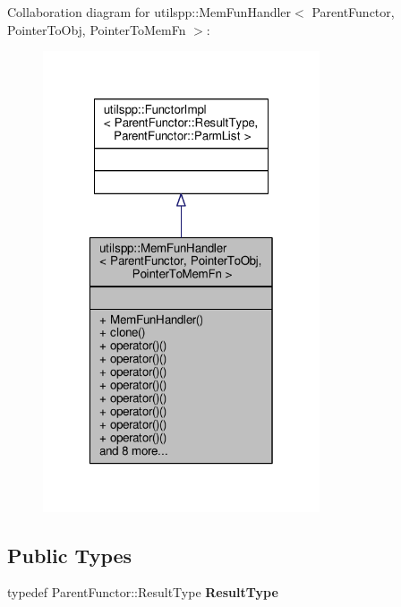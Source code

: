 Collaboration diagram for utilspp\-:\-:Mem\-Fun\-Handler$<$ Parent\-Functor, Pointer\-To\-Obj, Pointer\-To\-Mem\-Fn $>$\-:
\nopagebreak
\begin{figure}[H]
\begin{center}
\leavevmode
\includegraphics[width=232pt]{classutilspp_1_1MemFunHandler__coll__graph}
\end{center}
\end{figure}
\subsection*{Public Types}
\begin{DoxyCompactItemize}
\item 
\hypertarget{classutilspp_1_1MemFunHandler_a0d25808d7d9945c438e1e532e7569921}{typedef Parent\-Functor\-::\-Result\-Type {\bfseries Result\-Type}}\label{classutilspp_1_1MemFunHandler_a0d25808d7d9945c438e1e532e7569921}

\end{DoxyCompactItemize}

